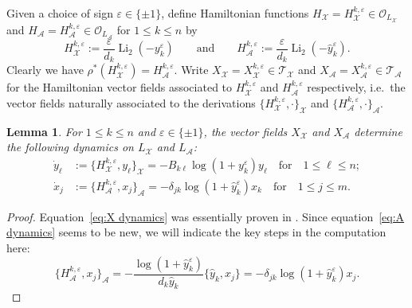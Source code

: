 \documentclass{amsart}
\newtheorem{lemma}[theorem]{Lemma}
\numberwithin{equation}{section}
\newcommand{\cA}{\mathcal{A}}
\newcommand{\cO}{\mathcal{O}}
\newcommand{\cX}{\mathcal{X}}
\newcommand{\cT}{\mathcal{T}}
\newcommand{\Li}{\operatorname{Li}}
\begin{document}
Given a choice of sign $\varepsilon\in\{\pm1\}$, define Hamiltonian functions $H_\cX=H^{k,\varepsilon}_\cX\in\cO_{L_\cX}$ and $H_\cA=H^{k,\varepsilon}_\cA\in\cO_{L_\cA}$ for $1\le k\le n$ by
\begin{equation}
  \label{eq:hamiltonians}
  H_\cX^{k,\varepsilon}:=\frac{\varepsilon}{d_k}\Li_2(-y_k^\varepsilon)\qquad\text{and}\qquad H_\cA^{k,\varepsilon}:=\frac{\varepsilon}{d_k}\Li_2(-\hat y_k^\varepsilon).
\end{equation}
Clearly we have $\rho^*(H_\cX^{k,\varepsilon})=H_\cA^{k,\varepsilon}$.
Write $X_\cX=X_\cX^{k,\varepsilon}\in\cT_\cX$ and $X_\cA=X_\cA^{k,\varepsilon}\in\cT_\cA$ for the Hamiltonian vector fields associated to $H_\cX^{k,\varepsilon}$ and $H_\cA^{k,\varepsilon}$ respectively, i.e.\ the vector fields naturally associated to the derivations $\{H_\cX^{k,\varepsilon},\cdot\}_\cX$ and $\{H_\cA^{k,\varepsilon},\cdot\}_\cA$.
\begin{lemma}
  \label{le:hamiltonian dynamics}
  For $1\le k\le n$ and $\varepsilon\in\{\pm1\}$, the vector fields $X_\cX$ and $X_\cA$ determine the following dynamics on $L_\cX$ and $L_\cA$:
  \begin{align}
    \label{eq:X dynamics}
    \dot y_\ell&:=\{H_\cX^{k,\varepsilon},y_\ell\}_\cX=-B_{k\ell}\log(1+y_k^\varepsilon)y_\ell\quad\text{for}\quad 1\le\ell\le n;\\
    \label{eq:A dynamics}
    \dot x_j&:=\{H_\cA^{k,\varepsilon},x_j\}_\cA=-\delta_{jk}\log(1+\hat y_k^\varepsilon)x_k\quad\text{for}\quad 1\le j\le m.
  \end{align}
\end{lemma}
\begin{proof}
  Equation~\eqref{eq:X dynamics} was essentially proven in \cite{MR3691969}.
  Since equation~\eqref{eq:A dynamics} seems to be new, we will indicate the key steps in the computation here:
  \[\{H_\cA^{k,\varepsilon},x_j\}_\cA=-\frac{\log(1+\hat y_k^\varepsilon)}{d_k\hat y_k}\{\hat y_k,x_j\}=-\delta_{jk}\log(1+\hat y_k^\varepsilon)x_j.\]
\end{proof}
\end{document}

